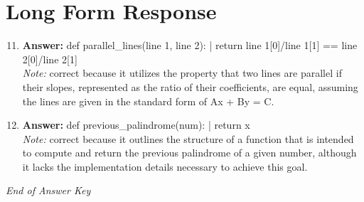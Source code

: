 \documentclass[12pt]{article}
\begin{document}
\section*{Long Form Response}
\begin{enumerate}[label=\arabic*.]
\setcounter{enumi}{10}
\item \textbf{Answer:} def parallel\_lines(line 1, line 2): | return line 1[0]/line 1[1] == line 2[0]/line 2[1]
\\ \textit{Note:} correct because it utilizes the property that two lines are parallel if their slopes, represented as the ratio of their coefficients, are equal, assuming the lines are given in the standard form of Ax + By = C.
\item \textbf{Answer:} def previous\_palindrome(num): | return x
\\ \textit{Note:} correct because it outlines the structure of a function that is intended to compute and return the previous palindrome of a given number, although it lacks the implementation details necessary to achieve this goal.
\end{enumerate}

\vfill
\noindent\textit{End of Answer Key}
\end{document}
